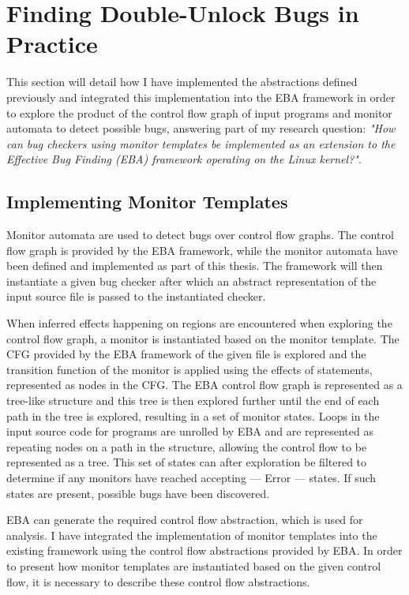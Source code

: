 \section{Finding Double-Unlock Bugs in Practice}
\label{implementation}

\noindent This section will detail how I have implemented the abstractions defined previously and integrated this implementation into the EBA framework in order to explore the product of the control flow graph of input programs and monitor automata to detect possible bugs, answering part of my research question: \textit{"How can bug checkers using monitor templates be implemented as an extension to the Effective Bug Finding (EBA) framework operating on the Linux kernel?"}.

\subsection{Implementing Monitor Templates}
\newpar Monitor automata are used to detect bugs over control flow graphs. The control flow graph is provided by the EBA framework, while the monitor automata have been defined and implemented as part of this thesis. The framework will then instantiate a given bug checker after which an abstract representation of the input source file is passed to the instantiated checker. 

\newpar When inferred effects happening on regions are encountered when exploring the control flow graph, a monitor is instantiated based on the monitor template. The CFG provided by the EBA framework of the given file is explored and the transition function of the monitor is applied using the effects of statements, represented as nodes in the CFG. The EBA control flow graph is represented as a tree-like structure and this tree is then explored further until the end of each path in the tree is explored, resulting in a set of monitor states. Loops in the input source code for programs are unrolled by EBA and are represented as repeating nodes on a path in the structure, allowing the control flow to be represented as a tree. This set of states can after exploration be filtered to determine if any monitors have reached accepting --- Error --- states. If such states are present, possible bugs have been discovered. 

\newpar EBA can generate the required control flow abstraction, which is used for analysis. I have integrated the implementation of monitor templates into the existing framework using the control flow abstractions provided by EBA. In order to present how monitor templates are instantiated based on the given control flow, it is necessary to describe these control flow abstractions. 


